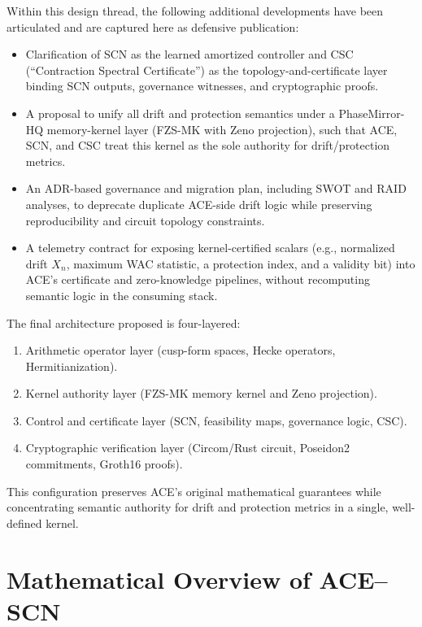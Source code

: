\documentclass[11pt]{article}
\begin{document}
Within this design thread, the following additional developments have been articulated and are captured here as defensive publication:

\begin{itemize}[leftmargin=*]
  \item Clarification of SCN as the learned amortized controller and CSC (``Contraction Spectral Certificate'') as the topology-and-certificate layer binding SCN outputs, governance witnesses, and cryptographic proofs.
  \item A proposal to unify all drift and protection semantics under a PhaseMirror-HQ memory-kernel layer (FZS-MK with Zeno projection), such that ACE, SCN, and CSC treat this kernel as the sole authority for drift/protection metrics.
  \item An ADR-based governance and migration plan, including SWOT and RAID analyses, to deprecate duplicate ACE-side drift logic while preserving reproducibility and circuit topology constraints.
  \item A telemetry contract for exposing kernel-certified scalars (e.g., normalized drift \(X_n\), maximum WAC statistic, a protection index, and a validity bit) into ACE's certificate and zero-knowledge pipelines, without recomputing semantic logic in the consuming stack.
\end{itemize}

The final architecture proposed is four-layered:
\begin{enumerate}[leftmargin=*]
  \item Arithmetic operator layer (cusp-form spaces, Hecke operators, Hermitianization).
  \item Kernel authority layer (FZS-MK memory kernel and Zeno projection).
  \item Control and certificate layer (SCN, feasibility maps, governance logic, CSC).
  \item Cryptographic verification layer (Circom/Rust circuit, Poseidon2 commitments, Groth16 proofs).
\end{enumerate}

This configuration preserves ACE's original mathematical guarantees while concentrating semantic authority for drift and protection metrics in a single, well-defined kernel.

\section{Mathematical Overview of ACE--SCN}
\end{document}
